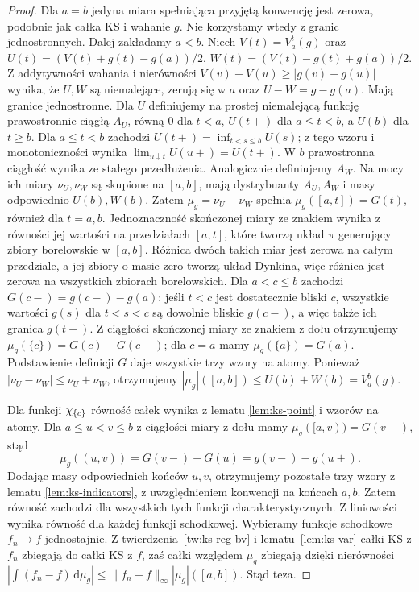 \begin{proof}
Dla $a=b$ jedyna miara spełniająca przyjętą konwencję
jest zerowa, podobnie jak całka KS i wahanie $g$.
Nie korzystamy wtedy z granic jednostronnych.
Dalej zakładamy $a<b$.
Niech $V(t)=V_a^t(g)$ oraz $U(t)=(V(t)+g(t)-g(a))/2$, $W(t)=(V(t)-g(t)+g(a))/2$. Z addytywności wahania i nierówności $V(v)-V(u)\ge|g(v)-g(u)|$ wynika, że $U,W$ są niemalejące, zerują się w $a$ oraz $U-W=g-g(a)$. Mają granice jednostronne. Dla $U$ definiujemy na prostej niemalejącą funkcję prawostronnie ciągłą $A_U$, równą $0$ dla $t<a$, $U(t+)$ dla $a\le t<b$, a $U(b)$ dla $t\ge b$. Dla $a\le t<b$ zachodzi $U(t+)=\inf_{t<s\le b}U(s)$; z tego wzoru i monotoniczności wynika $\lim_{u\downarrow t}U(u+)=U(t+)$. W $b$ prawostronna ciągłość wynika ze stałego przedłużenia. Analogicznie definiujemy $A_W$. Na mocy  ich miary $\nu_U,\nu_W$ są skupione na $[a,b]$, mają dystrybuanty $A_U,A_W$ i masy odpowiednio $U(b),W(b)$. Zatem $\mu_g=\nu_U-\nu_W$ spełnia $\mu_g([a,t])=G(t)$, również dla $t=a,b$. Jednoznaczność skończonej miary ze znakiem wynika z równości jej wartości na przedziałach $[a,t]$, które tworzą układ $\pi$ generujący zbiory borelowskie w $[a,b]$. Różnica dwóch takich miar jest zerowa na całym przedziale, a jej zbiory o masie zero tworzą układ Dynkina, więc różnica jest zerowa na wszystkich zbiorach borelowskich. Dla $a<c\le b$ zachodzi $G(c-)=g(c-)-g(a)$: jeśli $t<c$ jest dostatecznie bliski $c$, wszystkie wartości $g(s)$ dla $t<s<c$ są dowolnie bliskie $g(c-)$, a więc także ich granica $g(t+)$. Z ciągłości skończonej miary ze znakiem z dołu otrzymujemy $\mu_g(\{c\})=G(c)-G(c-)$; dla $c=a$ mamy $\mu_g(\{a\})=G(a)$. Podstawienie definicji $G$ daje wszystkie trzy wzory na atomy. Ponieważ $|\nu_U-\nu_W|\le\nu_U+\nu_W$, otrzymujemy
$|\mu_g|([a,b])\le U(b)+W(b)=V_a^b(g)$.

Dla funkcji $\chi_{\{c\}}$ równość całek wynika
z lematu \ref{lem:ks-point} i wzorów na atomy.
Dla $a\le u<v\le b$ z ciągłości miary z dołu mamy
$\mu_g([a,v))=G(v-)$, stąd
\[
 \mu_g((u,v))=G(v-)-G(u)=g(v-)-g(u+).
\]
Dodając masy odpowiednich końców $u,v$, otrzymujemy
pozostałe trzy wzory z lematu \ref{lem:ks-indicators},
z uwzględnieniem konwencji na końcach $a,b$.
Zatem równość zachodzi dla wszystkich tych funkcji
charakterystycznych. Z liniowości wynika równość dla każdej funkcji schodkowej. Wybieramy funkcje schodkowe $f_n\to f$ jednostajnie. Z twierdzenia~\ref{tw:ks-reg-bv} i lematu~\ref{lem:ks-var} całki KS z $f_n$ zbiegają do całki KS z $f$, zaś całki względem $\mu_g$ zbiegają dzięki nierówności $|\int(f_n-f)\,\mathrm d\mu_g|\le\|f_n-f\|_\infty|\mu_g|([a,b])$. Stąd teza.
\end{proof}


